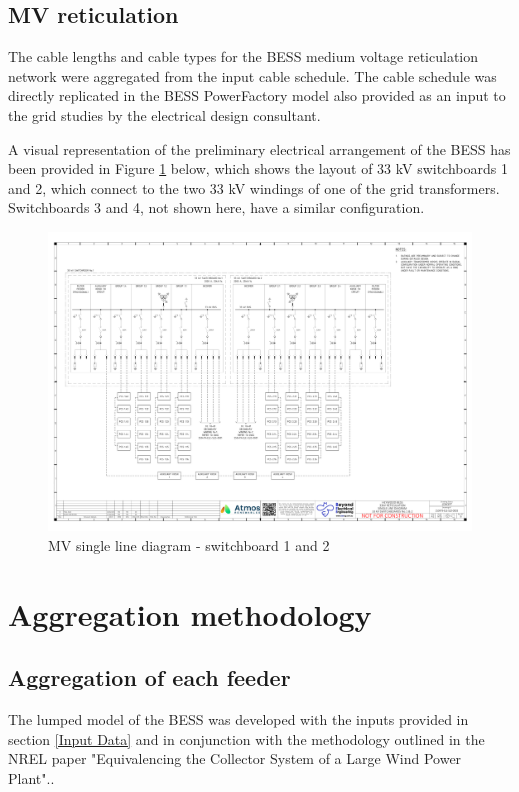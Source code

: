 \documentclass{../grid-link-report}
\begin{document}
	\section{MV reticulation}
	The cable lengths and cable types for the BESS medium voltage reticulation network were aggregated from the input cable schedule.\cite{MV cable schedule} The cable schedule was directly replicated in the BESS PowerFactory model also provided as an input to the grid studies by the electrical design consultant. 
	
	A visual representation of the preliminary electrical arrangement of the BESS has been provided in Figure \ref{fig:mv_sld1-2} below, which shows the layout of 33 kV switchboards 1 and 2, which connect to the two 33 kV windings of one of the grid transformers. Switchboards 3 and 4, not shown here, have a similar configuration.
	
	\begin{figure}[h]
		\centering
		\includegraphics[width=1.0\textwidth]{report-assets/images/250479-ELE-SLD-0003_B_33kV Reticulation SLD SB1-2.pdf}
		\caption{MV single line diagram - switchboard 1 and 2}
		\label{fig:mv_sld1-2}
	\end{figure}	

	\chapter{Aggregation methodology}
	
	\section{Aggregation of each feeder}
	\label{Aggregation Of Each Feeder}
	The lumped model of the BESS was developed with the inputs provided in section \ref{Input Data} and in conjunction with the methodology outlined in the NREL paper "Equivalencing the Collector System of a Large Wind Power Plant".\cite{equivalence paper 2006}.
	
\end{document}
